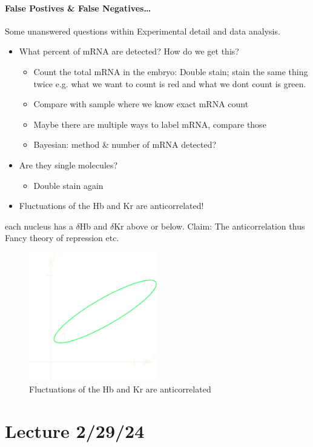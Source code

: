 \documentclass[../main.tex]{subfiles}
\begin{document}
\paragraph*{False Postives \& False Negatives\dots} Some unanswered questions within Experimental
detail and data analysis.
\begin{itemize}
    \item What percent of mRNA are detected? How do we get this?
    \begin{itemize}
        \item Count the total mRNA in the embryo: Double stain; stain the same thing twice e.g.
        what we want to count is red and what we dont count is green. 
        \item Compare with sample where we know exact mRNA count
        \item Maybe there are multiple ways to label mRNA, compare those
        \item Bayesian: method \& number of mRNA detected?
    \end{itemize}
    \item Are they single molecules?
    \begin{itemize}
        \item Double stain again
    \end{itemize}
    \item Fluctuations of the Hb and Kr are anticorrelated!
\end{itemize}
each nucleus has a $\delta$Hb and $\delta$Kr above or below. Claim: The anticorrelation thus Fancy
theory of repression etc.
\begin{figure}[ht]
    \centering
    \includegraphics[width=0.5\textwidth]{2channel.png}
    \caption{Fluctuations of the Hb and Kr are anticorrelated}
    \label{fig:fluct}
\end{figure}

\newpage
\section*{Lecture 2/29/24}
\barh \vspace{10px}
\end{document}
